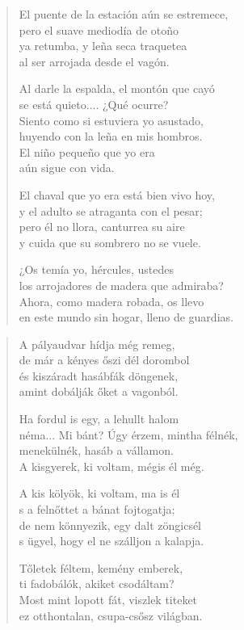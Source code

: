 \documentclass[11pt]{extbook}
\newcommand*{\centeredornament}{\centerline{\pgfornament[width=6cm]{88}}}
\begin{document}
\begin{verse}
  El puente de la estación aún se estremece, \\
  pero el suave mediodía de otoño \\
  ya retumba, y leña seca traquetea \\
  al ser arrojada desde el vagón.

  Al darle la espalda, el montón que cayó \\
  se está quieto.... ¿Qué ocurre? \\
  Siento como si estuviera yo asustado, \\
  huyendo con la leña en mis hombros. \\
  El niño pequeño que yo era \\
  aún sigue con vida.

  El chaval que yo era está bien vivo hoy, \\
  y el adulto se atraganta con el pesar; \\
  pero él no llora, canturrea su aire \\
  y cuida que su sombrero no se vuele.

  ¿Os temía yo, hércules, ustedes \\
  los arrojadores de madera que admiraba? \\
  Ahora, como madera robada, os llevo \\
  en este mundo sin hogar, lleno de guardias.
\end{verse}

\newpage

\vspace*{-15mm}
\centeredornament



\begin{verse}
  A pályaudvar hídja még remeg, \\
  de már a kényes őszi dél dorombol \\
  és kiszáradt hasábfák döngenek, \\
  amint dobálják őket a vagonból.

  Ha fordul is egy, a lehullt halom \\
  néma... Mi bánt? Úgy érzem, mintha félnék, \\
  menekülnék, hasáb a vállamon. \\
  A kisgyerek, ki voltam, mégis él még.

  A kis kölyök, ki voltam, ma is él \\
  s a felnőttet a bánat fojtogatja; \\
  de nem könnyezik, egy dalt zöngicsél \\
  s ügyel, hogy el ne szálljon a kalapja.

  Tőletek féltem, kemény emberek, \\
  ti fadobálók, akiket csodáltam? \\
  Most mint lopott fát, viszlek titeket \\
  ez otthontalan, csupa-csősz világban.
\end{verse}
\end{document}
